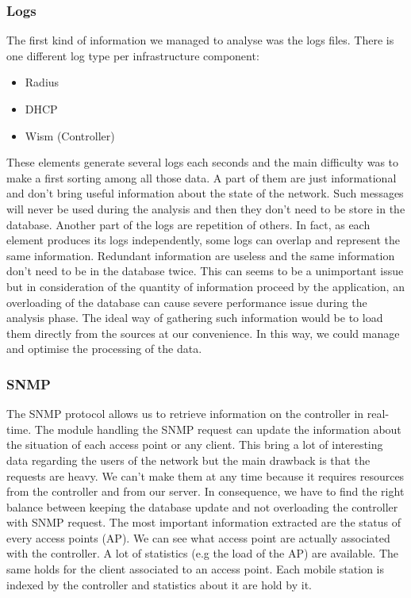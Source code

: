 \subsubsection{Logs}
The first kind of information we managed to analyse was the logs files. There is one different log type per infrastructure component:
\begin{itemize}
\item Radius
\item DHCP
\item Wism (Controller)
\end{itemize}
These elements generate several logs each seconds and the main difficulty was to make a first sorting among all those data. A part of them are just informational and don't bring useful information about the state of the network. Such messages will never be used during the analysis and then they don't need to be store in the database. Another part of the logs are repetition of others. In fact, as each element produces its logs independently, some logs can overlap and represent the same information. Redundant information are useless and the same information don't need to be in the database twice. This can seems to be a unimportant issue but in consideration of the quantity of information proceed by the application, an overloading of the database can cause severe performance issue during the analysis phase.
The ideal way of gathering such information would be to load them directly from the sources at our convenience. In this way, we could manage and optimise the processing of the data.

\subsubsection{SNMP}
The SNMP protocol allows us to retrieve information on the controller in real-time. The module handling the SNMP request can update the information about the situation of each access point or any client. This bring a lot of interesting data regarding the users of the network but the main drawback is that the requests are heavy. We can't make them at any time because it requires resources from the controller and from our server. In consequence, we have to find the right balance between keeping the database update and not overloading the controller with SNMP request.
The most important information extracted are the status of every access points (AP). We can see what access point are actually associated with the controller. A lot of statistics (e.g the load of the AP) are available.
The same holds for the client associated to an access point. Each mobile station is indexed by the controller and statistics about it are hold by it.

